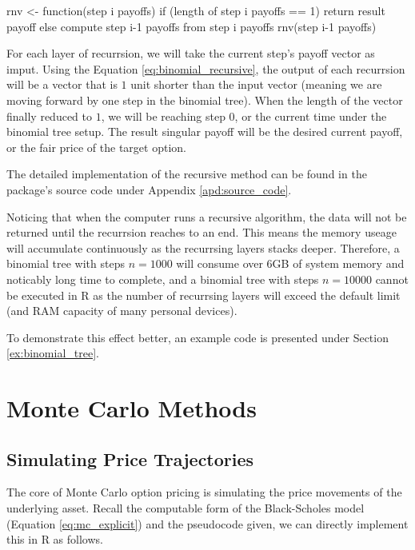 rnv <- function(step i payoffs) {
    if (length of step i payoffs == 1) {
        return result payoff
    } else {
        compute step i-1 payoffs from step i payoffs
        rnv(step i-1 payoffs)
    }
}

For each layer of recurrsion, we will take the current step's payoff vector as imput. Using the Equation \ref{eq:binomial_recursive}, the output of each recurrsion will be a vector that is $1$ unit shorter than the input vector (meaning we are moving forward by one step in the binomial tree). When the length of the vector finally reduced to $1$, we will be reaching step $0$, or the current time under the binomial tree setup. The result singular payoff will be the desired current payoff, or the fair price of the target option.

The detailed implementation of the recursive method can be found in the package's source code under Appendix \ref{apd:source_code}.

Noticing that when the computer runs a recursive algorithm, the data will not be returned until the recurrsion reaches to an end. This means the memory useage will accumulate continuously as the recurrsing layers stacks deeper. Therefore, a binomial tree with steps $n=1000$ will consume over 6GB of system memory and noticably long time to complete, and a binomial tree with steps $n=10000$ cannot be executed in R as the number of recurrsing layers will exceed the default limit (and RAM capacity of many personal devices).

To demonstrate this effect better, an example code is presented under Section \ref{ex:binomial_tree}.

\section{Monte Carlo Methods} \label{sec:mc_dev}

\subsection{Simulating Price Trajectories}

The core of Monte Carlo option pricing is simulating the price movements of the underlying asset. Recall the computable form of the Black-Scholes model (Equation \ref{eq:mc_explicit}) and the pseudocode given, we can directly implement this in R as follows.

